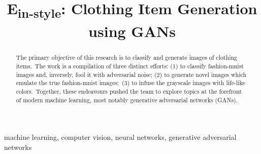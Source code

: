 \documentclass[conference]{IEEEtran}
\begin{document}
    \title{E\textsubscript{in-style}: Clothing Item Generation using GANs}

    \author{
    \and
    \and
    \and
    }

    \maketitle

    \begin{abstract}

        The primary objective of this research is to classify and generate images of clothing items.\ The work is a compilation of three distinct efforts: (1) to classify fashion-mnist images and, inversely, fool it with adversarial noise; (2) to generate novel images which emulate the true fashion-mnist images;\ (3) to infuse the grayscale images with life-like colors.\ Together, these endeavours pushed the team to explore topics at the forefront of modern machine learning, most notably generative adversarial networks (GANs).

    \end{abstract}

    \begin{IEEEkeywords}
        machine learning, computer vision, neural networks, generative adversarial networks
    \end{IEEEkeywords}
\end{document}
